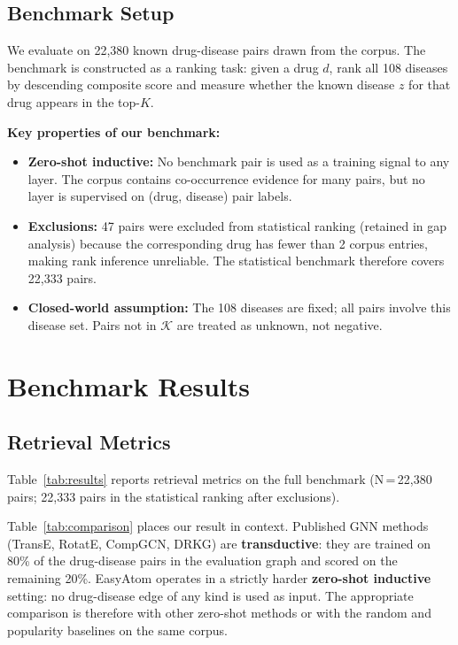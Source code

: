 \documentclass[11pt]{article}
\begin{document}
\subsection{Benchmark Setup}
\label{sec:benchmark}

We evaluate on 22,380 known drug-disease pairs drawn from the corpus.
The benchmark is constructed as a ranking task: given a drug $d$,
rank all 108 diseases by descending composite score and measure
whether the known disease $z$ for that drug appears in the top-$K$.

\textbf{Key properties of our benchmark:}
\begin{itemize}[noitemsep]
  \item \textbf{Zero-shot inductive:} No benchmark pair is used as a
    training signal to any layer. The corpus contains co-occurrence
    evidence for many pairs, but no layer is supervised on
    (drug, disease) pair labels.
  \item \textbf{Exclusions:} 47 pairs were excluded from statistical
    ranking (retained in gap analysis) because the corresponding drug
    has fewer than 2 corpus entries, making rank inference unreliable.
    The statistical benchmark therefore covers 22,333 pairs.
  \item \textbf{Closed-world assumption:} The 108 diseases are fixed;
    all pairs involve this disease set.
    Pairs not in $\mathcal{K}$ are treated as unknown, not negative.
\end{itemize}

\section{Benchmark Results}
\label{sec:results}

\subsection{Retrieval Metrics}

Table~\ref{tab:results} reports retrieval metrics on the full benchmark
(N\,=\,22,380 pairs; 22,333 pairs in the statistical ranking after exclusions).

Table~\ref{tab:comparison} places our result in context.
Published GNN methods (TransE, RotatE, CompGCN, DRKG) are
\textbf{transductive}: they are trained on 80\% of the drug-disease
pairs in the evaluation graph and scored on the remaining 20\%.
EasyAtom operates in a strictly harder \textbf{zero-shot inductive}
setting: no drug-disease edge of any kind is used as input.
The appropriate comparison is therefore with other zero-shot methods
or with the random and popularity baselines on the same corpus.
\end{document}
